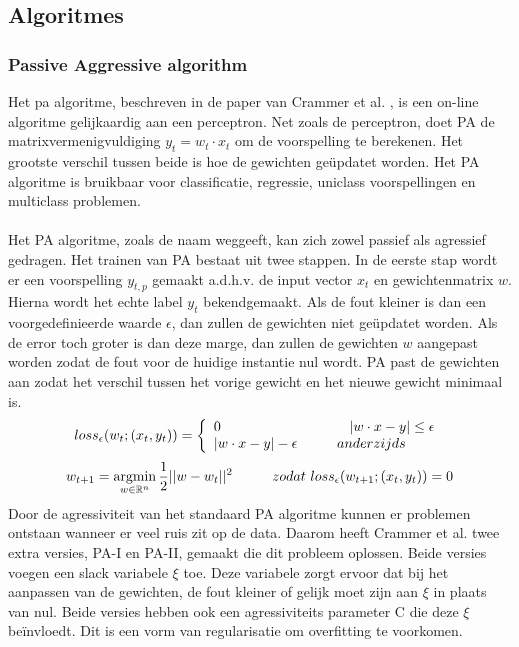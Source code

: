 \subsection*{Algoritmes}
\subsubsection*{Passive Aggressive algorithm}
Het \gls{pa} algoritme, beschreven in de paper van Crammer et al. \cite{pa algorithm}, is een on-line algoritme gelijkaardig aan een perceptron. Net zoals de perceptron, doet PA de matrixvermenigvuldiging $y_t=w_t \cdot x_t$ om de voorspelling te berekenen. Het grootste verschil tussen beide is hoe de gewichten geüpdatet worden. Het PA algoritme is bruikbaar voor classificatie, regressie, uniclass voorspellingen en multiclass problemen.
\\\\
\noindent Het PA algoritme, zoals de naam weggeeft, kan zich zowel passief als agressief gedragen. Het trainen van PA bestaat uit twee stappen. In de eerste stap wordt er een voorspelling $y_{t,p}$ gemaakt a.d.h.v. de input vector $x_t$ en gewichtenmatrix $w$. Hierna wordt het echte label $y_t$ bekendgemaakt. Als de fout kleiner is dan een voorgedefinieerde waarde $\epsilon$, dan zullen de gewichten niet geüpdatet worden. Als de error toch groter is dan deze marge, dan zullen de gewichten $w$ aangepast worden zodat de fout voor de huidige instantie nul wordt. PA past de gewichten aan zodat het verschil tussen het vorige gewicht en het nieuwe gewicht minimaal is. 
\[
    loss_{\epsilon} (w_t;(x_t,y_t))=\left\{
                \begin{array}{ll}
                  0 \tab \tab \tab \ \ |w \cdot x - y| \leq \epsilon \\
                  |w \cdot x - y| - \epsilon \tab anderzijds
                \end{array}
              \right.\\
\]
\[
    w_{t+1}= \operatorname*{argmin}_{w \in \mathbb{R}^n}
     \frac{1}{2}||w-w_t||^2 \hspace*{1cm} zodat \ loss_{\epsilon} (w_{t+1};(x_t,y_t)) = 0
\]
Door de agressiviteit van het standaard PA algoritme kunnen er problemen ontstaan wanneer er veel ruis zit op de data. Daarom heeft Crammer et al. twee extra versies, PA-I en PA-II, gemaakt die dit probleem oplossen. Beide versies voegen een slack variabele $\xi$ toe. Deze variabele zorgt ervoor dat bij het aanpassen van de gewichten, de fout kleiner of gelijk moet zijn aan $\xi$ in plaats van nul. Beide versies hebben ook een agressiviteits parameter C die deze $\xi$ beïnvloedt. Dit is een vorm van regularisatie om overfitting te voorkomen.

